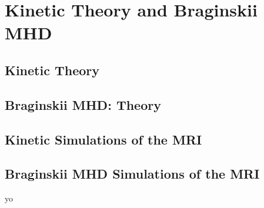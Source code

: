 \chapter{Kinetic Theory and Braginskii MHD}
\section{Kinetic Theory}

\section{Braginskii MHD: Theory}

\section{Kinetic Simulations of the MRI}

\section{Braginskii MHD Simulations of the MRI}
yo



